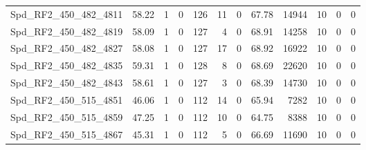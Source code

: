 \begin{longtable}[c]{@{}lrrrrrrrrrrr@{}}
Spd\_RF2\_450\_482\_4811     & 58.22                  & 1                       & 0                       & 126                    & 11                      & 0                       & 67.78                   & 14944                    & 10                       & 0                        & 0                        \\
Spd\_RF2\_450\_482\_4819     & 58.09                  & 1                       & 0                       & 127                    & 4                       & 0                       & 68.91                   & 14258                    & 10                       & 0                        & 0                        \\
Spd\_RF2\_450\_482\_4827     & 58.08                  & 1                       & 0                       & 127                    & 17                      & 0                       & 68.92                   & 16922                    & 10                       & 0                        & 0                        \\
Spd\_RF2\_450\_482\_4835     & 59.31                  & 1                       & 0                       & 128                    & 8                       & 0                       & 68.69                   & 22620                    & 10                       & 0                        & 0                        \\
Spd\_RF2\_450\_482\_4843     & 58.61                  & 1                       & 0                       & 127                    & 3                       & 0                       & 68.39                   & 14730                    & 10                       & 0                        & 0                        \\
Spd\_RF2\_450\_515\_4851     & 46.06                  & 1                       & 0                       & 112                    & 14                      & 0                       & 65.94                   & 7282                     & 10                       & 0                        & 0                        \\
Spd\_RF2\_450\_515\_4859     & 47.25                  & 1                       & 0                       & 112                    & 10                      & 0                       & 64.75                   & 8388                     & 10                       & 0                        & 0                        \\
Spd\_RF2\_450\_515\_4867     & 45.31                  & 1                       & 0                       & 112                    & 5                       & 0                       & 66.69                   & 11690                    & 10                       & 0                        & 0                        \\

\end{longtable}
